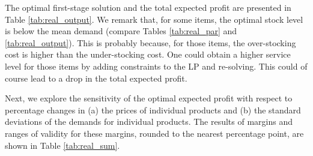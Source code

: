 \documentclass[a4paper,11pt]{article}
\begin{document}
The optimal first-stage solution and the total expected profit are presented in Table \ref{tab:real_output}. We remark that, for some items, the optimal stock level is below the mean demand (compare Tables \ref{tab:real_par} and \ref{tab:real_output}). This is probably because, for those items, the over-stocking cost is higher than the under-stocking cost. One could obtain a higher service level for those items by adding constraints to the LP and re-solving. This could of course lead to a drop in the total expected profit.

\begin{table}[htb]
\centering
\caption{Optimal first-stage solution and expected profit}
\label{tab:real_output}
\end{table}

Next, we explore the sensitivity of the optimal expected profit with respect to percentage changes in (a) the prices of individual products and (b) the standard deviations of the demands for individual products. The results of margins and ranges of validity for these margins, rounded to the nearest percentage point, are shown in Table \ref{tab:real_sum}.
\end{document}
